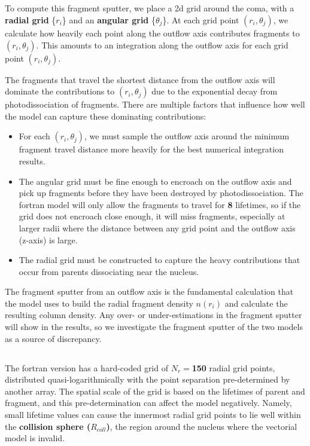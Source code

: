 \documentclass[11pt]{article}
\newcommand{\modelterm}[1]{\textcolor{myred}{\textbf{#1}}}
\newcommand{\magicnumber}[1]{\textcolor{myred}{\textbf{#1}}}
\newcommand{\problempart}[1]{\subsection*{\contour{mybblack}{\textcolor{myblack}{#1}}}}
\begin{document}
\problempart{Fragment Sputter}
To compute this fragment sputter, we place a 2d grid around the coma, with a \modelterm{radial grid} \{\(r_i\)\} and an \modelterm{angular grid} \{\(\theta_j\)\}.
At each grid point \((r_i, \theta_j)\), we calculate how heavily each point along the outflow axis contributes fragments to \((r_i, \theta_j)\).
This amounts to an integration along the outflow axis for each grid point \((r_i, \theta_j)\).

The fragments that travel the shortest distance from the outflow axis will dominate the contributions to \((r_i, \theta_j)\) due to the exponential decay from photodissociation of fragments.
There are multiple factors that influence how well the model can capture these dominating contributions:
\begin{itemize}
  \item For each \((r_i, \theta_j)\), we must sample the outflow axis around the minimum fragment travel distance more heavily for the best numerical integration results.
  \item The angular grid must be fine enough to encroach on the outflow axis and pick up fragments before they have been destroyed by photodissociation.
    The fortran model will only allow the fragments to travel for \magicnumber{8} lifetimes, so if the grid does not encroach close enough, it will miss fragments, especially at larger radii where the distance between any grid point and the outflow axis (z-axis) is large.
  \item The radial grid must be constructed to capture the heavy contributions that occur from parents dissociating near the nucleus.
\end{itemize}

The fragment sputter from an outflow axis is the fundamental calculation that the model uses to build the radial fragment density \(n(r_{i})\) and calculate the resulting column density.
Any over- or under-estimations in the fragment sputter will show in the results, so we investigate the fragment sputter of the two models as a source of discrepancy.

\problempart{Spatial Gridding: Fortran}
The fortran version has a hard-coded grid of \(N_r = \)\magicnumber{150} radial grid points, distributed quasi-logarithmically with the point separation pre-determined by another array.
The spatial scale of the grid is based on the lifetimes of parent and fragment, and this pre-determination can affect the model negatively.
Namely, small lifetime values can cause the innermost radial grid points to lie well within the \modelterm{collision sphere (\(R_{coll}\))}, the region around the nucleus where the vectorial model is invalid.
\end{document}
